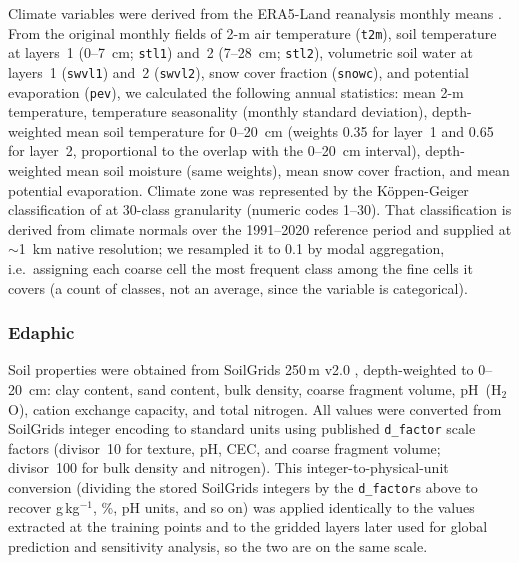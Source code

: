 \documentclass[12pt, a4paper]{article}
\begin{document}
Climate variables were derived from the ERA5-Land reanalysis monthly
means \citep[2001--2020;][]{MunozSabater2021}. From the original monthly
fields of 2-m air temperature (\texttt{t2m}), soil temperature at
layers~1 (0--7~cm; \texttt{stl1}) and~2 (7--28~cm; \texttt{stl2}),
volumetric soil water at layers~1 (\texttt{swvl1}) and~2
(\texttt{swvl2}), snow cover fraction (\texttt{snowc}), and potential
evaporation (\texttt{pev}), we calculated the following annual
statistics: mean 2-m temperature, temperature seasonality (monthly
standard deviation), depth-weighted mean soil temperature for 0--20~cm
(weights 0.35 for layer~1 and 0.65 for layer~2, proportional to the
overlap with the 0--20~cm interval), depth-weighted mean soil moisture
(same weights), mean snow cover fraction, and mean potential
evaporation. Climate zone was represented by the K\"oppen-Geiger
classification of \citet{Beck2023} at 30-class granularity (numeric
codes 1--30). That classification is derived from climate normals over
the 1991--2020 reference period and supplied at ${\sim}$1~km native
resolution; we resampled it to 0.1\textdegree{} by modal aggregation,
i.e.\ assigning each coarse cell the most frequent class among the fine
cells it covers (a count of classes, not an average, since the variable
is categorical).

\subsubsection{Edaphic}

Soil properties were obtained from SoilGrids 250\,m v2.0
\citep{Poggio2021}, depth-weighted to 0--20~cm: clay content, sand
content, bulk density, coarse fragment volume, pH~(H$_2$O), cation
exchange capacity, and total nitrogen. All values were converted from
SoilGrids integer encoding to standard units using published
\texttt{d\_factor} scale factors (divisor~10 for texture, pH, CEC, and
coarse fragment volume; divisor~100 for bulk density and nitrogen).
This integer-to-physical-unit conversion (dividing the stored SoilGrids
integers by the \texttt{d\_factor}s above to recover g\,kg$^{-1}$, \%,
pH units, and so on) was applied identically to the values extracted at
the training points and to the gridded layers later used for global
prediction and sensitivity analysis, so the two are on the same scale.
\end{document}
